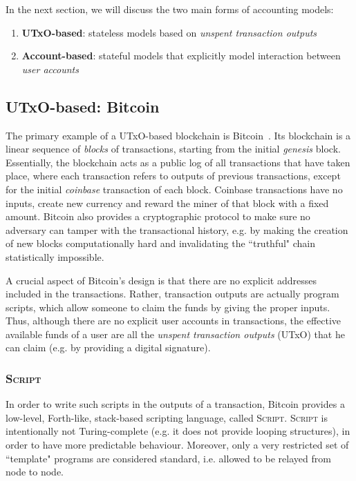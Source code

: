 \documentclass[acmsmall,nonacm=true,screen=true]{acmart}
\begin{document}
In the next section, we will discuss the two main forms of accounting models:
\begin{enumerate}
\item \textbf{UTxO-based}: stateless models based on \textit{unspent transaction outputs}
\item \textbf{Account-based}: stateful models that explicitly model interaction between \textit{user accounts}
\end{enumerate}

\subsection{UTxO-based: Bitcoin} \label{subsec:bitcoin}
The primary example of a UTxO-based blockchain is Bitcoin~\cite{bitcoin}.
Its blockchain is a linear sequence of \textit{blocks} of transactions,
starting from the initial \textit{genesis} block.
Essentially, the blockchain acts as a public log of all transactions that have taken place, where
each transaction refers to outputs of previous transactions,
except for the initial \textit{coinbase} transaction of each block.
Coinbase transactions have no inputs, create new currency and reward the miner of that block with a fixed amount.
Bitcoin also provides a cryptographic protocol to make sure no adversary can tamper with the transactional history,
e.g. by making the creation of new blocks computationally hard and invalidating the ``truthful" chain statistically impossible.

A crucial aspect of Bitcoin's design is that there are no explicit addresses included in the transactions.
Rather, transaction outputs are actually program scripts, which allow someone to claim the funds by giving the proper inputs.
Thus, although there are no explicit user accounts in transactions, the effective available funds of a user
are all the \textit{unspent transaction outputs} (UTxO) that he can claim (e.g. by providing a digital signature).

\subsubsection{\textsc{Script}}
In order to write such scripts in the outputs of a transaction, Bitcoin provides a low-level, Forth-like,
stack-based scripting language, called \textsc{Script}.
\textsc{Script} is intentionally not Turing-complete (e.g. it does not provide looping structures),
in order to have more predictable behaviour.
Moreover, only a very restricted set of ``template" programs are considered standard, i.e.
allowed to be relayed from node to node.
\end{document}
